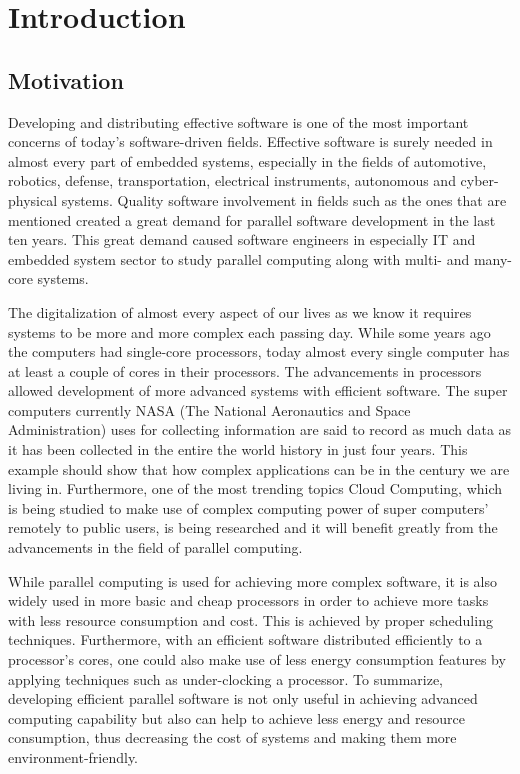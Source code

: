 
\chapter{Introduction}
\section{Motivation}
Developing and distributing effective software is one of the most important concerns of today's software-driven fields. Effective software is surely needed in almost every part of embedded systems, especially in the fields of automotive, robotics, defense, transportation, electrical instruments, autonomous and cyber-physical systems. Quality software involvement in fields such as the ones that are mentioned created a great demand for parallel software development in the last ten years. This great demand caused software engineers in especially IT and embedded system sector to study parallel computing along with multi- and many- core systems.

The digitalization of almost every aspect of our lives as we know it requires systems to be more and more complex each passing day. While some years ago the computers had single-core processors, today almost every single computer has at least a couple of cores in their processors. The advancements in processors allowed development of more advanced systems with efficient software. The super computers currently NASA (The National Aeronautics and Space Administration) uses for collecting information are said to record as much data as it has been collected in the entire the world history in just four years. This example should show that how complex applications can be in the century we are living in. Furthermore, one of the most trending topics Cloud Computing, which is being studied to make use of complex computing power of super computers' remotely to public users, is being researched and it will benefit greatly from the advancements in the field of parallel computing.

While parallel computing is used for achieving more complex software, it is also widely used in more basic and cheap processors in order to achieve more tasks with less resource consumption and cost. This is achieved by proper scheduling techniques. Furthermore, with an efficient software distributed efficiently to a processor's cores, one could also make use of less energy consumption features by applying techniques such as under-clocking a processor. To summarize, developing efficient parallel software is not only useful in achieving advanced computing capability but also can help to achieve less energy and resource consumption, thus decreasing the cost of systems and making them more environment-friendly.

